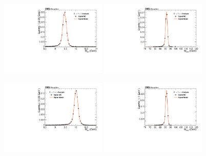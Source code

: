 \begin{figure}[!htbp]
\begin{center}


\includegraphics[width=0.45\textwidth]{figures/fitPlotFiles2D/ZToUpsilonPhotonSignalAndBackgroundFit/mMuMNU_ZToUpsilon1SPhotonSignalAndBackgroundFit_Signal_Cat1}\hspace*{1.cm}
\includegraphics[width=0.45\textwidth]{figures/fitPlotFiles2D/ZToUpsilonPhotonSignalAndBackgroundFit/mHZ_ZToUpsilon1SPhotonSignalAndBackgroundFit_Signal_Cat1_default}\hspace*{1.cm}

\includegraphics[width=0.45\textwidth]{figures/fitPlotFiles2D/ZToUpsilonPhotonSignalAndBackgroundFit/mMuMNU_ZToUpsilon2SPhotonSignalAndBackgroundFit_Signal_Cat1}\hspace*{1.cm}
\includegraphics[width=0.45\textwidth]{figures/fitPlotFiles2D/ZToUpsilonPhotonSignalAndBackgroundFit/mHZ_ZToUpsilon2SPhotonSignalAndBackgroundFit_Signal_Cat1_default}\hspace*{1.cm}


\end{center}
\end{figure}
